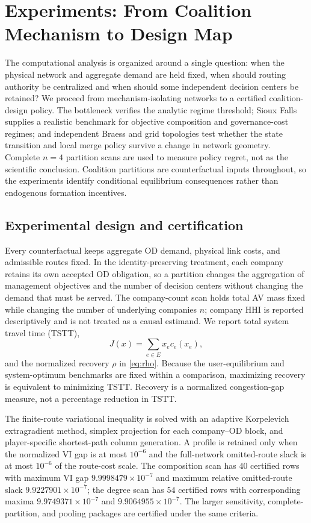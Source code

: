 \section{Experiments: From Coalition Mechanism to Design Map}\label{sec:experiments}

The computational analysis is organized around a single question: when the physical network and aggregate demand are held fixed, when should routing authority be centralized and when should some independent decision centers be retained? We proceed from mechanism-isolating networks to a certified coalition-design policy. The bottleneck verifies the analytic regime threshold; Sioux Falls supplies a realistic benchmark for objective composition and governance-cost regimes; and independent Braess and grid topologies test whether the state transition and local merge policy survive a change in network geometry. Complete $n=4$ partition scans are used to measure policy regret, not as the scientific conclusion. Coalition partitions are counterfactual inputs throughout, so the experiments identify conditional equilibrium consequences rather than endogenous formation incentives.

\subsection{Experimental design and certification}\label{sec:experiment-design}

Every counterfactual keeps aggregate OD demand, physical link costs, and admissible routes fixed. In the identity-preserving treatment, each company retains its own accepted OD obligation, so a partition changes the aggregation of management objectives and the number of decision centers without changing the demand that must be served. The company-count scan holds total AV mass fixed while changing the number of underlying companies $n$; company HHI is reported descriptively and is not treated as a causal estimand. We report total system travel time (TSTT),
\begin{equation*}
 J(x)=\sum_{e\in E}x_ec_e(x_e),
\end{equation*}
and the normalized recovery $\rho$ in \eqref{eq:rho}. Because the user-equilibrium and system-optimum benchmarks are fixed within a comparison, maximizing recovery is equivalent to minimizing TSTT. Recovery is a normalized congestion-gap measure, not a percentage reduction in TSTT.

The finite-route variational inequality is solved with an adaptive Korpelevich extragradient method, simplex projection for each company--OD block, and player-specific shortest-path column generation. A profile is retained only when the normalized VI gap is at most $10^{-6}$ and the full-network omitted-route slack is at most $10^{-6}$ of the route-cost scale. The composition scan has $40$ certified rows with maximum VI gap $9.9998479\times10^{-7}$ and maximum relative omitted-route slack $9.9227901\times10^{-7}$; the degree scan has $54$ certified rows with corresponding maxima $9.9749371\times10^{-7}$ and $9.9064955\times10^{-7}$. The larger sensitivity, complete-partition, and pooling packages are certified under the same criteria.

